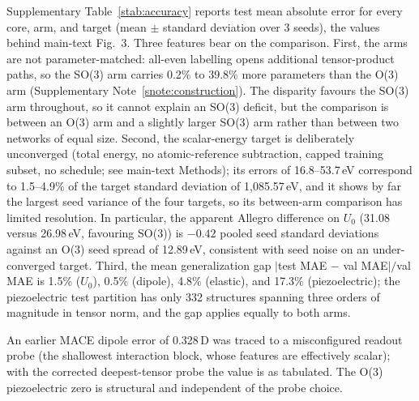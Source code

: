 Supplementary Table~\ref{stab:accuracy} reports test mean absolute error for every core, arm, and target (mean $\pm$ standard deviation over 3 seeds), the values behind main-text Fig.~3. Three features bear on the comparison. First, the arms are not parameter-matched: all-even labelling opens additional tensor-product paths, so the SO(3) arm carries 0.2\% to 39.8\% more parameters than the O(3) arm (Supplementary Note~\ref{snote:construction}). The disparity favours the SO(3) arm throughout, so it cannot explain an SO(3) deficit, but the comparison is between an O(3) arm and a slightly larger SO(3) arm rather than between two networks of equal size. Second, the scalar-energy target is deliberately unconverged (total energy, no atomic-reference subtraction, capped training subset, no schedule; see main-text Methods); its errors of 16.8--53.7\,eV correspond to 1.5--4.9\% of the target standard deviation of 1,085.57\,eV, and it shows by far the largest seed variance of the four targets, so its between-arm comparison has limited resolution. In particular, the apparent Allegro difference on $U_0$ (31.08 versus 26.98\,eV, favouring SO(3)) is $-0.42$ pooled seed standard deviations against an O(3) seed spread of 12.89\,eV, consistent with seed noise on an under-converged target. Third, the mean generalization gap $|$test MAE $-$ val MAE$|/$val MAE is 1.5\% ($U_0$), 0.5\% (dipole), 4.8\% (elastic), and 17.3\% (piezoelectric); the piezoelectric test partition has only 332 structures spanning three orders of magnitude in tensor norm, and the gap applies equally to both arms.

An earlier MACE dipole error of 0.328\,D was traced to a misconfigured readout probe (the shallowest interaction block, whose features are effectively scalar); with the corrected deepest-tensor probe the value is as tabulated. The O(3) piezoelectric zero is structural and independent of the probe choice.

